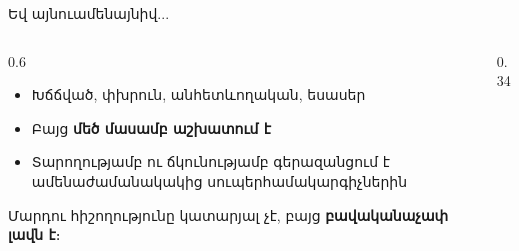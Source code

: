 \begin{frame}{Եվ այնուամենայնիվ...}
  \begin{columns}[c]
    \begin{column}{0.6\textwidth}
      \begin{itemize}
        \item Խճճված, փխրուն, անհետևողական, եսասեր
        \item Բայց \textbf{մեծ մասամբ աշխատում է}
        \item Տարողությամբ ու ճկունությամբ գերազանցում է ամենաժամանակակից սուպերհամակարգիչներին
      \end{itemize}
      \vspace{3mm}
      \begin{bookquote}
        Մարդու հիշողությունը կատարյալ չէ, բայց \textbf{բավականաչափ լավն է}։
      \end{bookquote}
    \end{column}
    \begin{column}{0.34\textwidth}
      \centering{}
    \end{column}
  \end{columns}
\end{frame}
